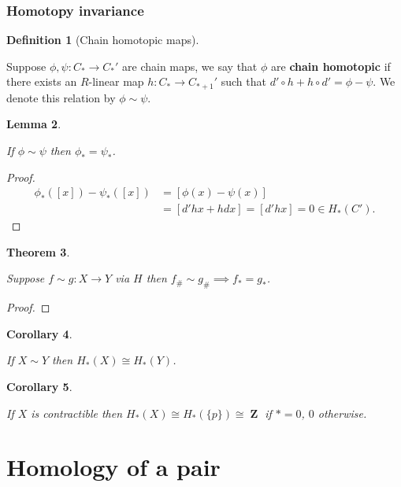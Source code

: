\documentclass[10pt,]{book}
\newcommand{\terminology}[1]{\textbf{#1}}
\theoremstyle{plain}
\newtheorem{theorem}{Theorem}[section]
\newtheorem{corollary}[theorem]{Corollary}
\newtheorem{lemma}[theorem]{Lemma}
\theoremstyle{definition}
\newtheorem{definition}[theorem]{Definition}
\numberwithin{equation}{section}
\DeclareMathOperator{\ZZ}{\mathbf{Z}}
\begin{document}
\subsubsection[Homotopy invariance]{Homotopy invariance}\label{subsubsection-1}
\begin{definition}[Chain homotopic maps]\label{definition-11}

              Suppose \(\phi,\psi\colon C_* \to C_*'\) are chain maps, we say that \(\phi\) are \terminology{chain homotopic} if there exists an \(R\)-linear map \(h\colon C_* \to C_{*+1}'\) such that \(d'\circ h + h \circ d' = \phi - \psi\).
              We denote this relation by \(\phi \sim \psi\).
              \end{definition}
\begin{lemma}\label{lemma-4}

                If \(\phi \sim \psi\) then \(\phi_* = \psi_*\).
              \end{lemma}
\begin{proof}
\begin{align*}
\phi_*([x]) - \psi_*([x]) &= [\phi(x) - \psi(x)]\\
&= [d'hx + hdx] = [d'hx] = 0 \in H_*(C').
\end{align*}\end{proof}
\begin{theorem}\label{theorem-1}

                Suppose \(f\sim g\colon X\to Y\) via \(H\) then \(f_\# \sim g_\# \implies f_* = g_*\).
              \end{theorem}
\begin{proof}
\end{proof}
\begin{corollary}\label{corollary-2}

                If \(X\sim Y\) then \(H_*(X) \cong H_*(Y)\).
              \end{corollary}
\begin{corollary}\label{corollary-3}

                If \(X\) is contractible then \(H_*(X) \cong H_*(\{p\}) \cong \ZZ\) if \(* = 0\), \(0\) otherwise.
              \end{corollary}
\typeout{************************************************}
\typeout{************************************************}
\section[Homology of a pair]{Homology of a pair}\label{sec-homology-pair}
\typeout{************************************************}
\typeout{************************************************}
\end{document}

